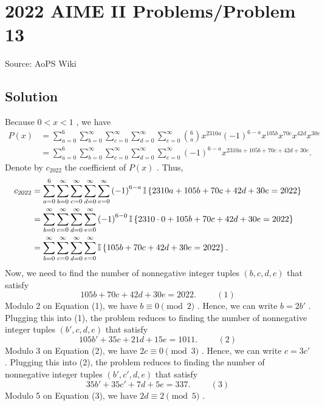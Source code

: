 \documentclass[12pt]{article}
\begin{document}
\section*{{2022 AIME II Problems/Problem 13}}
Source: AoPS Wiki

\subsection*{Solution}
Because $0 < x < 1$ , we have \begin{align*} P \left( x \right) & = \sum_{a=0}^6 \sum_{b=0}^\infty \sum_{c=0}^\infty \sum_{d=0}^\infty \sum_{e=0}^\infty \binom{6}{a} x^{2310a} \left( - 1 \right)^{6-a} x^{105b} x^{70c} x^{42d} x^{30e} \\ & = \sum_{a=0}^6 \sum_{b=0}^\infty \sum_{c=0}^\infty \sum_{d=0}^\infty \sum_{e=0}^\infty \left( - 1 \right)^{6-a} x^{2310 a + 105 b + 70 c + 42 d + 30 e} . \end{align*} Denote by $c_{2022}$ the coefficient of $P \left( x \right)$ .
Thus, \begin{align*} c_{2022} & = \sum_{a=0}^6 \sum_{b=0}^\infty \sum_{c=0}^\infty \sum_{d=0}^\infty \sum_{e=0}^\infty \left( - 1 \right)^{6-a} \Bbb I \left\{ 2310 a + 105 b + 70 c + 42 d + 30 e = 2022 \right\} \\ & = \sum_{b=0}^\infty \sum_{c=0}^\infty \sum_{d=0}^\infty \sum_{e=0}^\infty \left( - 1 \right)^{6-0} \Bbb I \left\{ 2310 \cdot 0 + 105 b + 70 c + 42 d + 30 e = 2022 \right\} \\ & = \sum_{b=0}^\infty \sum_{c=0}^\infty \sum_{d=0}^\infty \sum_{e=0}^\infty \Bbb I \left\{ 105 b + 70 c + 42 d + 30 e = 2022 \right\} . \end{align*} Now, we need to find the number of nonnegative integer tuples $\left( b , c , d , e \right)$ that satisfy \[ 105 b + 70 c + 42 d + 30 e = 2022 . \hspace{1cm} (1) \] Modulo 2 on Equation (1), we have $b \equiv 0 \pmod{2}$ .
Hence, we can write $b = 2 b'$ . Plugging this into (1), the problem reduces to finding the number of
nonnegative integer tuples $\left( b' , c , d , e \right)$ that satisfy \[ 105 b' + 35 c + 21 d + 15 e = 1011 . \hspace{1cm} (2) \] Modulo 3 on Equation (2), we have $2 c \equiv 0 \pmod{3}$ .
Hence, we can write $c = 3 c'$ . Plugging this into (2), the problem reduces to finding the number of
nonnegative integer tuples $\left( b' , c' , d , e \right)$ that satisfy \[ 35 b' + 35 c' + 7 d + 5 e = 337 . \hspace{1cm} (3) \] Modulo 5 on Equation (3), we have $2 d \equiv 2 \pmod{5}$ .
\end{document}
